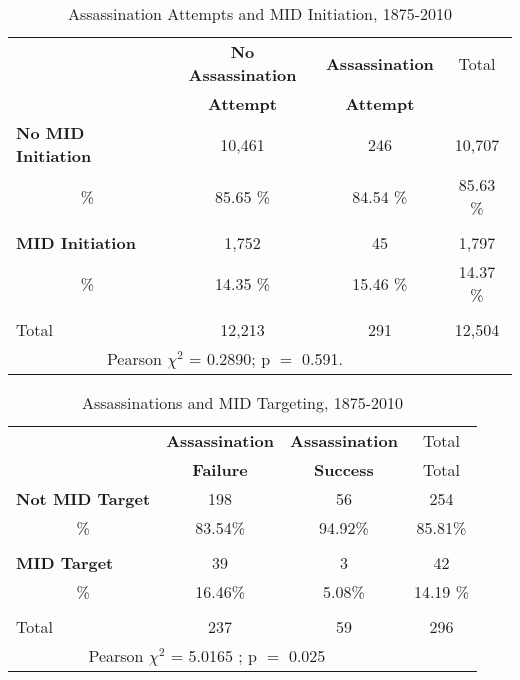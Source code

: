 \documentclass[12pt]{article}
\begin{document}
\begin{table}[htpb!]\caption{Assassination Attempts and MID Initiation, 1875-2010  \label{cross_init}}
 \centering
\begin{tabular}{l | c c c}\hline
\hline
\multicolumn{1}{c}{\textbf{}} & \textbf{No Assassination}  & \textbf{Assassination} & Total\\
\multicolumn{1}{c}{\textbf{}} & \textbf{ Attempt}  & \textbf{Attempt} & \\
\hline

\textbf{No MID Initiation}  &       10,461              &   246        &   10,707    \\
   \multicolumn{1}{c}{\%}&     85.65 \%         &  84.54 \%     &  85.63 \%      \\
&&&\\
\textbf{MID Initiation} &       1,752             &   45     &    1,797   \\
     \multicolumn{1}{c}{\%}&     14.35 \%         & 15.46 \%   &   14.37 \% \\
     &&&\\
\hline
Total                   &        12,213         &   291          &   12,504   \\

\hline
\multicolumn{3}{c}{\scriptsize{Pearson $\chi^2$ =  0.2890;   p $=$ 0.591.}}\\
\end{tabular}
\end{table}


\begin{table}[htpb!]\caption{Assassinations and MID Targeting, 1875-2010   \label{cross_tar}}
 \centering
\begin{tabular}{l c c c}\hline
\hline
\multicolumn{1}{c}{\textbf{}} & \textbf{Assassination}  & \textbf{Assassination} & Total\\
\multicolumn{1}{c}{\textbf{}} & \textbf{ Failure}  & \textbf{Success} & Total\\
\hline

\textbf{Not MID Target}  &       198              &   56        &   254   \\
   \multicolumn{1}{c}{\%}&      83.54\%         &  94.92\%     &  85.81\%      \\
&&&\\
\textbf{MID Target} &       39            &   3    &   42   \\
     \multicolumn{1}{c}{\%}&     16.46\%         & 5.08\%   &   14.19 \% \\
     &&&\\
\hline
Total                   &        237        &   59         &   296  \\

\hline
\multicolumn{3}{c}{\scriptsize{Pearson $\chi^2$ =  5.0165 ;   p $=$ 0.025}}\\
\end{tabular}
\end{table}
\end{document}
